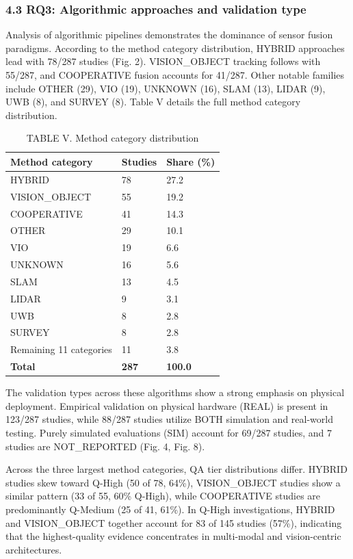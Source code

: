 \documentclass[conference]{IEEEtran}
\begin{document}
\subsubsection{4.3 RQ3: Algorithmic approaches and validation type}


Analysis of algorithmic pipelines demonstrates the dominance of sensor fusion paradigms. According to the method category distribution, HYBRID approaches lead with 78/287 studies (Fig. 2). VISION\_OBJECT tracking follows with 55/287, and COOPERATIVE fusion accounts for 41/287. Other notable families include OTHER (29), VIO (19), UNKNOWN (16), SLAM (13), LIDAR (9), UWB (8), and SURVEY (8). Table V details the full method category distribution.



\begin{table}[htbp]
\centering
\caption{TABLE V. Method category distribution}
\label{tab:5}
\begin{tabular}{l l l}
\hline
Method category & Studies & Share (\%) \\
\hline
HYBRID & 78 & 27.2 \\
\hline
VISION\_OBJECT & 55 & 19.2 \\
\hline
COOPERATIVE & 41 & 14.3 \\
\hline
OTHER & 29 & 10.1 \\
\hline
VIO & 19 & 6.6 \\
\hline
UNKNOWN & 16 & 5.6 \\
\hline
SLAM & 13 & 4.5 \\
\hline
LIDAR & 9 & 3.1 \\
\hline
UWB & 8 & 2.8 \\
\hline
SURVEY & 8 & 2.8 \\
\hline
Remaining 11 categories & 11 & 3.8 \\
\hline
\textbf{Total} & \textbf{287} & \textbf{100.0} \\
\hline
\end{tabular}
\end{table}



The validation types across these algorithms show a strong emphasis on physical deployment. Empirical validation on physical hardware (REAL) is present in 123/287 studies, while 88/287 studies utilize BOTH simulation and real-world testing. Purely simulated evaluations (SIM) account for 69/287 studies, and 7 studies are NOT\_REPORTED (Fig. 4, Fig. 8).

Across the three largest method categories, QA tier distributions differ. HYBRID studies skew toward Q-High (50 of 78, 64\%), VISION\_OBJECT studies show a similar pattern (33 of 55, 60\% Q-High), while COOPERATIVE studies are predominantly Q-Medium (25 of 41, 61\%). In Q-High investigations, HYBRID and VISION\_OBJECT together account for 83 of 145 studies (57\%), indicating that the highest-quality evidence concentrates in multi-modal and vision-centric architectures.
\end{document}
